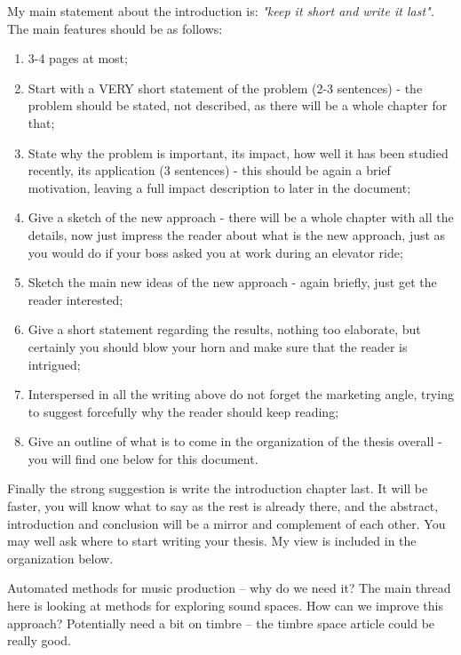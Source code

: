 \label{chapter:introduction}

My main statement about the introduction is:
\textit{"keep it short and write it last".} The main features should be as follows:
\begin{enumerate}
\item {3-4 pages at most;}
\item {Start with a VERY short statement of the problem (2-3 sentences) - the problem should be stated, not described, as there will be a whole chapter for that;}
\item {State why the problem is important, its impact, how well it has been studied recently, its application (3 sentences) - this should be again a brief motivation, leaving a full impact description to later in the document;}
\item {Give a sketch of the new approach - there will be a whole chapter with all the details, now just impress the reader about what is the new approach, just as you would do if your boss asked you at work during an elevator ride;}
\item {Sketch the main new ideas of the new approach - again briefly, just get the reader interested;}
\item {Give a short statement regarding the results, nothing too elaborate, but certainly you should blow your horn and make sure that the reader is intrigued;}
\item {Interspersed in all the writing above do not forget the marketing angle, trying to suggest forcefully why the reader should keep reading;}
\item {Give an outline of what is to come in the organization of the thesis overall - you will find one below for this document.}

\end{enumerate}

Finally the strong suggestion is write the introduction chapter last. It will be faster, you will know what to say as the rest is already there, and the abstract, introduction and conclusion will be a mirror and complement of each other. You may well ask where to start writing your thesis. My view is included in the organization below.


Automated methods for music production -- why do we need it? The main thread here is looking at methods for exploring sound spaces. How can we improve this approach? Potentially need a bit on timbre -- the timbre space article could be really good.


